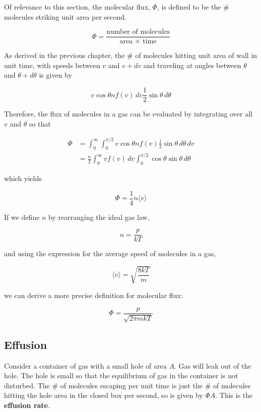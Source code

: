\documentclass[svgnames]{article}     %
\begin{document}
Of relevance to this section, the molecular flux, $\Phi$, is defined to be the
\# molecules striking unit area per second. 

\[
  \Phi = \frac{\text{number of molecules}}{\text{area } \times \text{ time}}
\] \vspace{5px}

As derived in the previous chapter, the \# of molecules hitting unit area of
wall in unit time, with speeds between $v$ and $v + dv$ and traveling at angles
between $\theta$ and $\theta + d\theta$ is given by 

\[
v \cos \theta n f(v) \, dv \frac{1}{2}\sin\theta \, d\theta
\] \vspace{5px}

Therefore, the flux of molecules in a gas can be evaluated by integrating over
all $v$ and $\theta$ so that

 \begin{align*}
   \Phi &= \int_{0}^{\infty} \int_{0}^{\pi/2} v\cos\theta n f(v)
   \frac{1}{2}\sin\theta \, d\theta \, dv \\
        &= \frac{n}{2}\int_{0}^{\infty} vf(v) \, dv \int_{0}^{\pi/2}
        \cos\theta\sin\theta \, d\theta
\end{align*}

which yields 

\[
  \boxed{\Phi = \frac{1}{4}n\langle v \rangle}
\] \vspace{5px}

If we define $n$ by rearranging the ideal gas law, 

\[
n = \frac{p}{kT}
\] \vspace{5px}

and using the expression for the average speed of molecules in a gas, 

\[
\langle v \rangle = \sqrt{\frac{8kT}{m}}
\] \vspace{5px}

we can derive a more precise definition for molecular flux: 

\[
  \boxed{ \Phi = \frac{p}{\sqrt{2\pi m kT}}}
\] \vspace{5px}

\subsection{Effusion}

Consider a container of gas with a small hole of area $A$. Gas will leak out of
the hole. The hole is small so that the equilibrium of gas in the container is
not disturbed. The \# of molecules escaping per unit time is just the \# of
molecules hitting the hole area in the closed box per second, so is given by
$\Phi A$. This is the \textbf{effusion rate}. 
\end{document}
